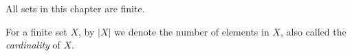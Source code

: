 

\setcounter{section}{1}
\setcounter{subsection}{0}
\setcounter{dfn}{0}

All sets in this chapter are finite.

For a finite set $X$, by $|X|$ we denote the number of elements in $X$, also called the \emph{cardinality} of $X$.



